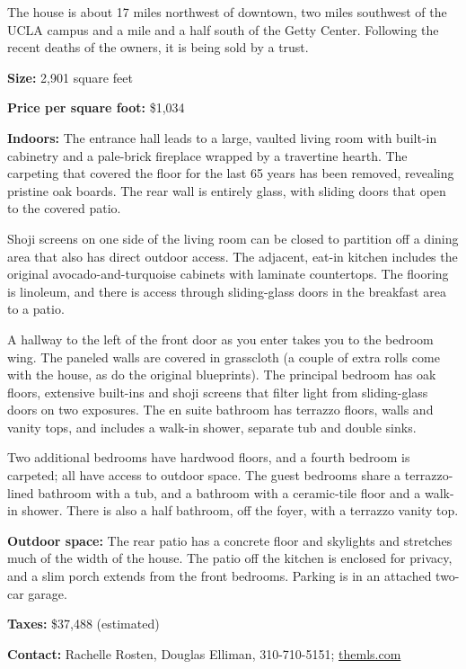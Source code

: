 The house is about 17 miles northwest of downtown, two miles southwest
of the UCLA campus and a mile and a half south of the Getty Center.
Following the recent deaths of the owners, it is being sold by a trust.

\textbf{Size:} 2,901 square feet

\textbf{Price per square foot:} \$1,034

\textbf{Indoors:} The entrance hall leads to a large, vaulted living
room with built-in cabinetry and a pale-brick fireplace wrapped by a
travertine hearth. The carpeting that covered the floor for the last 65
years has been removed, revealing pristine oak boards. The rear wall is
entirely glass, with sliding doors that open to the covered patio.

Shoji screens on one side of the living room can be closed to partition
off a dining area that also has direct outdoor access. The adjacent,
eat-in kitchen includes the original avocado-and-turquoise cabinets with
laminate countertops. The flooring is linoleum, and there is access
through sliding-glass doors in the breakfast area to a patio.

A hallway to the left of the front door as you enter takes you to the
bedroom wing. The paneled walls are covered in grasscloth (a couple of
extra rolls come with the house, as do the original blueprints). The
principal bedroom has oak floors, extensive built-ins and shoji screens
that filter light from sliding-glass doors on two exposures. The en
suite bathroom has terrazzo floors, walls and vanity tops, and includes
a walk-in shower, separate tub and double sinks.

Two additional bedrooms have hardwood floors, and a fourth bedroom is
carpeted; all have access to outdoor space. The guest bedrooms share a
terrazzo-lined bathroom with a tub, and a bathroom with a ceramic-tile
floor and a walk-in shower. There is also a half bathroom, off the
foyer, with a terrazzo vanity top.

\textbf{Outdoor space:} The rear patio has a concrete floor and
skylights and stretches much of the width of the house. The patio off
the kitchen is enclosed for privacy, and a slim porch extends from the
front bedrooms. Parking is in an attached two-car garage.

\textbf{Taxes:} \$37,488 (estimated)

\textbf{Contact:} Rachelle Rosten, Douglas Elliman, 310-710-5151;
\href{https://www.themls.com/Dashboards/sharedListings/umy8HDsQE6biI1Kg7vcWsaHkHimy3wEL2FjPmYAtYec5_M3NP6Zkd_ygiWOSsKW6H4dyJ1JjEr41}{themls.com}

